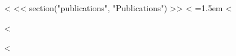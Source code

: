 <%
<< section("publications", "Publications") >>
<%
\noindent\hangindent=1.5em <%

\vspace{4pt}
<%

<%
